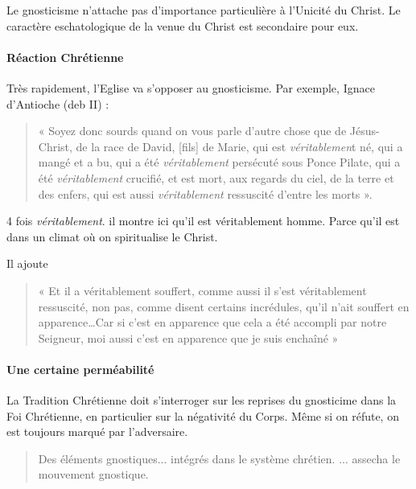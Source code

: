     \begin{Synthesis}
        Le gnosticisme n'attache pas d'importance particulière à l'Unicité du Christ. Le caractère eschatologique de la venue du Christ est secondaire pour eux.
    \end{Synthesis}
    
    
    \paragraph{Réaction Chrétienne}
Très rapidement, l'Eglise va s'opposer au gnosticisme. Par exemple, Ignace d'Antioche (deb II)  :
\begin{quote}
« Soyez donc sourds quand on vous parle d'autre chose que de
Jésus-Christ, de la race de David, {[}fils{]} de Marie, qui est
\emph{véritablemen}t né, qui a mangé et a bu, qui a été
\emph{véritablement} persécuté sous Ponce Pilate, qui a été
\emph{véritablement} crucifié, et est mort, aux regards du ciel, de la
terre et des enfers, qui est aussi \emph{véritablement} ressuscité
d'entre les morts ».
\end{quote}
4 fois \textit{véritablement}. il montre ici qu'il est véritablement homme. Parce qu'il est dans un climat où on spiritualise le Christ.

Il ajoute 
\begin{quote}
« Et il a véritablement souffert, comme aussi il s'est véritablement
ressuscité, non pas, comme disent certains incrédules, qu'il n'ait
souffert en apparence\ldots Car si c'est en apparence que cela a été
accompli par notre Seigneur, moi aussi c'est en apparence que je suis
enchaîné » 
\end{quote}

\paragraph{Une certaine perméabilité} La Tradition Chrétienne doit s'interroger sur les reprises du gnosticime dans la Foi Chrétienne, en particulier sur la négativité du Corps. Même si on réfute, on est toujours marqué par l'adversaire. 
\begin{quote}
    Des éléments gnostiques... intégrés dans le système chrétien. ... assecha le mouvement gnostique. 
\end{quote}


